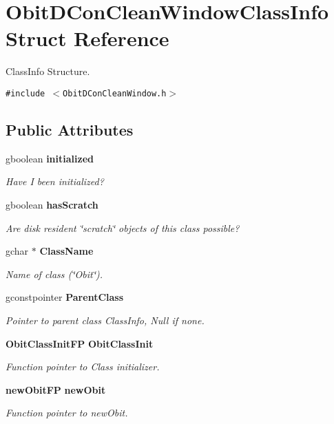 \section{Obit\-DCon\-Clean\-Window\-Class\-Info Struct Reference}
\label{structObitDConCleanWindowClassInfo}
Class\-Info Structure.  


{\tt \#include $<$Obit\-DCon\-Clean\-Window.h$>$}

\subsection*{Public Attributes}
\begin{CompactItemize}
\item 
gboolean {\bf initialized}
\begin{CompactList}\small\item\em Have I been initialized? \item\end{CompactList}\item 
gboolean {\bf has\-Scratch}
\begin{CompactList}\small\item\em Are disk resident \char`\"{}scratch\char`\"{} objects of this class possible? \item\end{CompactList}\item 
gchar $\ast$ {\bf Class\-Name}
\begin{CompactList}\small\item\em Name of class (\char`\"{}Obit\char`\"{}). \item\end{CompactList}\item 
gconstpointer {\bf Parent\-Class}
\begin{CompactList}\small\item\em Pointer to parent class Class\-Info, Null if none. \item\end{CompactList}\item 
{\bf Obit\-Class\-Init\-FP} {\bf Obit\-Class\-Init}
\begin{CompactList}\small\item\em Function pointer to Class initializer. \item\end{CompactList}\item 
{\bf new\-Obit\-FP} {\bf new\-Obit}
\begin{CompactList}\small\item\em Function pointer to new\-Obit. \item\end{CompactList}\item 

\end{CompactItemize}
